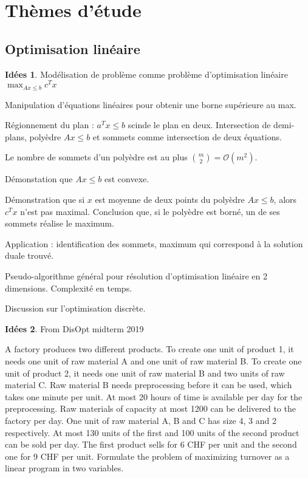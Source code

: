 \documentclass[a4paper,12pt, notitlepage]{article}
\theoremstyle{definition}
\newtheorem{idee}{Idées}
\begin{document}
\section{Thèmes d'étude}

\subsection{Optimisation linéaire}

\begin{idee}
	Modélisation de problème comme problème d'optimisation linéaire $\max_{Ax \leq b}{c^T x}$
	
	Manipulation d'équations linéaires pour obtenir une borne supérieure au max.
	
	Régionnement du plan : $a^T x \leq b$ scinde le plan en deux.
	Intersection de demi-plans, polyèdre $Ax \leq b$ et sommets comme intersection de deux équations.
	
	Le nombre de sommets d'un polyèdre est au plus ${m \choose 2} = \mathcal{O}(m^2)$.
	
	Démonstation que $Ax \leq b$ est convexe.
	
	Démonstration que si $x$ est moyenne de deux points du polyèdre $Ax \leq b$, alors $c^Tx$ n'est pas maximal.
	Conclusion que, si le polyèdre est borné, un de ses sommets réalise le maximum.
	
	Application : identification des sommets, maximum qui correspond à la solution duale trouvé.
	
	Pseudo-algorithme général pour résolution d'optimisation linéaire en 2 dimensions.
	Complexité en temps.
	
	Discussion sur l'optimisation discrète.	
\end{idee}

\begin{idee}
	From DisOpt midterm 2019
	
	A factory produces two different products. To create one unit of product 1, it needs one unit of
	raw material A and one unit of raw material B. To create one unit of product 2, it needs one unit
	of raw material B and two units of raw material C. Raw material B needs preprocessing before it
	can be used, which takes one minute per unit. At most 20 hours of time is available per day for
	the preprocessing. Raw materials of capacity at most 1200 can be delivered to the factory per day.
	One unit of raw material A, B and C has size 4, 3 and 2 respectively.
	At most 130 units of the first and 100 units of the second product can be sold per day. The first
	product sells for 6 CHF per unit and the second one for 9 CHF per unit.
	Formulate the problem of maximizing turnover as a linear program in two variables.

\end{idee}
\end{document}
